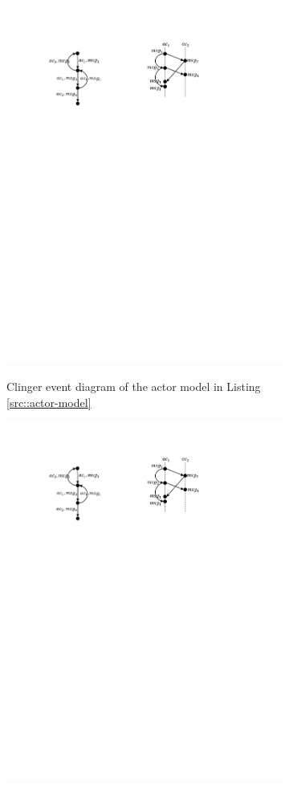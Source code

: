 \begin{figure}
\centering
\begin{subfigure}[b]{0.2\textwidth}
\label{fig::clinger}
  \centering
  \small{
   \includegraphics[width=.8\textwidth]{resources/clinger.pdf}
  }
  \caption{Clinger event diagram of the actor model in Listing \ref{src::actor-model}}
\end{subfigure}
\qquad
\begin{subfigure}[b]{0.2\textwidth}
\label{fig::cdg}
  \centering
  \small{
   \includegraphics[width=.8\textwidth]{resources/cdg.pdf}
}
\end{subfigure}
\end{figure}
